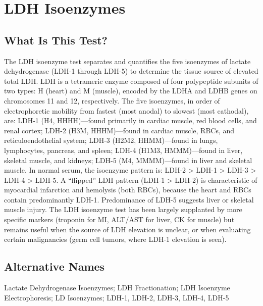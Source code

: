 \chapter{LDH Isoenzymes}

\section*{What Is This Test?}
The LDH isoenzyme test separates and quantifies the five isoenzymes of lactate dehydrogenase (LDH-1 through LDH-5) to determine the tissue source of elevated total LDH. LDH is a tetrameric enzyme composed of four polypeptide subunits of two types: H (heart) and M (muscle), encoded by the LDHA and LDHB genes on chromosomes 11 and 12, respectively. The five isoenzymes, in order of electrophoretic mobility from fastest (most anodal) to slowest (most cathodal), are: LDH-1 (H4, HHHH)---found primarily in cardiac muscle, red blood cells, and renal cortex; LDH-2 (H3M, HHHM)---found in cardiac muscle, RBCs, and reticuloendothelial system; LDH-3 (H2M2, HHMM)---found in lungs, lymphocytes, pancreas, and spleen; LDH-4 (H1M3, HMMM)---found in liver, skeletal muscle, and kidneys; LDH-5 (M4, MMMM)---found in liver and skeletal muscle. In normal serum, the isoenzyme pattern is: LDH-2 > LDH-1 > LDH-3 > LDH-4 > LDH-5. A ``flipped'' LDH pattern (LDH-1 > LDH-2) is characteristic of myocardial infarction and hemolysis (both RBCs), because the heart and RBCs contain predominantly LDH-1. Predominance of LDH-5 suggests liver or skeletal muscle injury. The LDH isoenzyme test has been largely supplanted by more specific markers (troponin for MI, ALT/AST for liver, CK for muscle) but remains useful when the source of LDH elevation is unclear, or when evaluating certain malignancies (germ cell tumors, where LDH-1 elevation is seen).

\section*{Alternative Names}
Lactate Dehydrogenase Isoenzymes; LDH Fractionation; LDH Isoenzyme Electrophoresis; LD Isoenzymes; LDH-1, LDH-2, LDH-3, LDH-4, LDH-5

